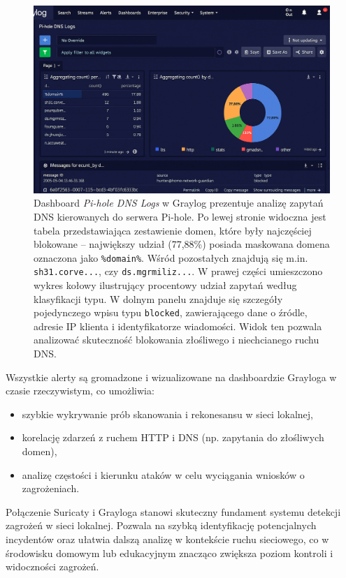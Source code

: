 \documentclass[
    left=2.5cm,         %
    right=2.5cm,        %
    top=2.5cm,          %
    bottom=3cm,         %
    bindingoffset=6mm,  %
    nohyphenation=true %
]{eiti/eiti-thesis} %
\begin{document}
\newpage
\begin{figure}[H]
    \centering
    \includegraphics[width=\textwidth]{img/graylog_dns.png}
    \caption{Dashboard \textit{Pi-hole DNS Logs} w Graylog prezentuje analizę zapytań DNS kierowanych do serwera Pi-hole. Po lewej stronie widoczna jest tabela przedstawiająca zestawienie domen, które były najczęściej blokowane – największy udział (77{,}88\%) posiada maskowana domena oznaczona jako \texttt{\%domain\%}. Wśród pozostałych znajdują się m.in. \texttt{sh31.corve...},  czy \texttt{ds.mgrmiliz...}. W prawej części umieszczono wykres kołowy ilustrujący procentowy udział zapytań według klasyfikacji typu. W dolnym panelu znajduje się szczegóły pojedynczego wpisu typu \texttt{blocked}, zawierającego dane o źródle, adresie IP klienta i identyfikatorze wiadomości. Widok ten pozwala analizować skuteczność blokowania złośliwego i niechcianego ruchu DNS.}
    \label{fig:graylog-dns-blocks}
\end{figure}


Wszystkie alerty są gromadzone i wizualizowane na dashboardzie Grayloga w czasie rzeczywistym, co umożliwia:
\begin{itemize}
    \item szybkie wykrywanie prób skanowania i rekonesansu w sieci lokalnej,
    \item korelację zdarzeń z ruchem HTTP i DNS (np. zapytania do złośliwych domen),
    \item analizę częstości i kierunku ataków w celu wyciągania wniosków o zagrożeniach.
\end{itemize}

Połączenie Suricaty i Grayloga stanowi skuteczny fundament systemu detekcji zagrożeń w sieci lokalnej. Pozwala na szybką identyfikację potencjalnych incydentów oraz ułatwia dalszą analizę w kontekście ruchu sieciowego, co w środowisku domowym lub edukacyjnym znacząco zwiększa poziom kontroli i widoczności zagrożeń.
\end{document}
